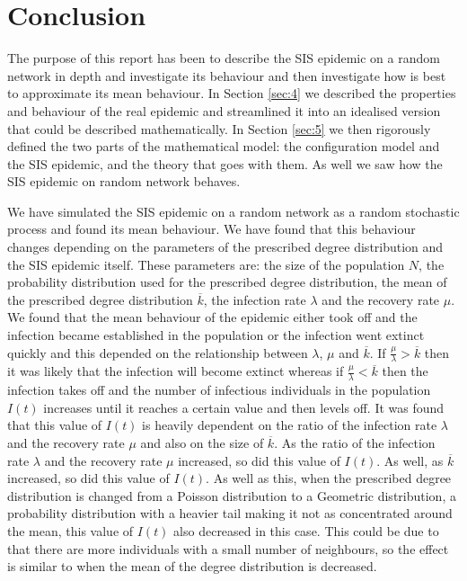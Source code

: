 \documentclass{uonmathsreport}
\begin{document}
\newpage
\section{Conclusion} \label{sec:8}

The purpose of this report has been to describe the SIS epidemic on a random network in depth and investigate its behaviour and then investigate how is best to approximate its mean behaviour. In Section \ref{sec:4} we described the properties and behaviour of the real epidemic and streamlined it into an idealised version that could be described mathematically. In Section \ref{sec:5} we then rigorously defined the two parts of the mathematical model: the configuration model and the SIS epidemic, and the theory that goes with them. As well we saw how the SIS epidemic on random network behaves.

We have simulated the SIS epidemic on a random network as a random stochastic process and found its mean behaviour. We have found that this behaviour changes depending on the parameters of the prescribed degree distribution and the SIS epidemic itself. These parameters are: the size of the population $N$, the probability distribution used for the prescribed degree distribution, the mean of the prescribed degree distribution $\overline{k}$, the infection rate $\lambda$ and the recovery rate $\mu$. We found that the mean behaviour of the epidemic either took off and the infection became established in the population or the infection went extinct quickly and this depended on the relationship between $\lambda$, $\mu$ and $\overline{k}$. If $\frac{\mu}{\lambda}>\overline{k}$ then it was likely that the infection will become extinct whereas if $\frac{\mu}{\lambda}<\overline{k}$ then the infection takes off and the number of infectious individuals in the population $I(t)$ increases until it reaches a certain value and then levels off. It was found that this value of $I(t)$ is heavily dependent on the ratio of the infection rate $\lambda$ and the recovery rate $\mu$ and also on the size of $\overline{k}$. As the ratio of the infection rate $\lambda$ and the recovery rate $\mu$ increased, so did this value of $I(t)$. As well, as $\overline{k}$ increased, so did this value of $I(t)$. As well as this, when the prescribed degree distribution is changed from a Poisson distribution to a Geometric distribution, a probability distribution with a heavier tail making it not as concentrated around the mean, this value of $I(t)$ also decreased in this case. This could be due to that there are more individuals with a small number of neighbours, so the effect is similar to when the mean of the degree distribution is decreased.
\end{document}
